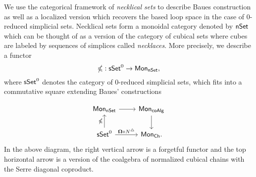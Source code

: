 We use the categorical framework of \textit{necklical sets} to describe Baues construction as well as a localized version which recovers the based loop space in the case of $0$-reduced simplicial sets. Necklical sets form a monoidal category denoted by $\mathsf{nSet}$ which can be thought of as a version of the category of cubical sets where cubes are labeled by sequences of simplices called \textit{necklaces}. More precisely, we describe a functor $$\mathbb{\Omega}: \mathsf{sSet}^0 \to \mathsf{Mon}_{\mathsf{nSet}},$$ where $\mathsf{sSet}^0$ denotes the category of $0$-reduced simplicial sets, which fits into a commutative square extending Baues' constructions

\begin{equation*}
\begin{tikzcd}
\Mon_{\nSet} \arrow[r] & \Mon_{\coAlg} \arrow[d] \\
\sSet^0 \arrow[r, "\cobar \circ \chains"] \arrow[u, "\gcobar"] & \Mon_{\Ch}.
\end{tikzcd}
\end{equation*}
In the above diagram, the right vertical arrow is a forgetful functor and the top horizontal arrow is a version of the coalgebra of normalized cubical chains with the Serre diagonal coproduct. 

